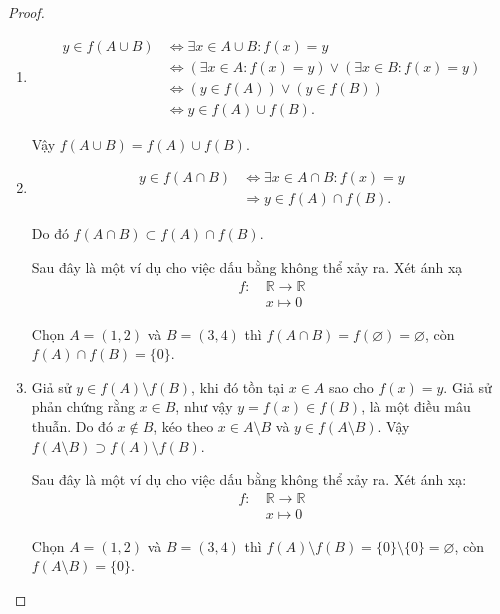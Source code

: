 \begin{proof}
    \begin{enumerate}[label = (\alph*)]
        \item \begin{align*}
                 y\in f(A\cup B) & \Longleftrightarrow \exists x\in A\cup B: f(x) = y \\
                                 & \Longleftrightarrow (\exists x\in A: f(x) = y) \lor (\exists x\in B: f(x) = y) \\
                                 & \Longleftrightarrow (y\in f(A)) \lor (y\in f(B)) \\
                                 & \Longleftrightarrow y\in f(A)\cup f(B).
              \end{align*}

              Vậy $f(A\cup B) = f(A)\cup f(B)$.

        \item \begin{align*}
                  y\in f(A\cap B) & \Longleftrightarrow \exists x\in A\cap B: f(x) = y \\
                                  & \Longrightarrow y\in f(A)\cap f(B).
              \end{align*}

              Do đó $f(A\cap B) \subset f(A)\cap f(B)$.

              \bigskip
              Sau đây là một ví dụ cho việc dấu bằng không thể xảy ra. Xét ánh xạ
              \begin{align*}
                  f:\ & \mathbb{R}\rightarrow \mathbb{R} \\
                      & x\mapsto 0
              \end{align*}
              
              Chọn $A = (1, 2)$ và $B = (3, 4)$ thì $f(A\cap B) = f(\varnothing) = \varnothing$, còn $f(A)\cap f(B) = \{ 0 \}$.

        \item Giả sử $y\in f(A)\setminus f(B)$, khi đó tồn tại $x\in A$ sao cho $f(x) = y$. Giả sử phản chứng rằng $x\in B$, như vậy $y = f(x)\in f(B)$, là một điều mâu thuẫn. Do đó $x\notin B$, kéo theo $x\in A\setminus B$ và $y\in f(A\setminus B)$. Vậy $f(A\setminus B)\supset f(A)\setminus f(B)$.

              \bigskip
              Sau đây là một ví dụ cho việc dấu bằng không thể xảy ra. Xét ánh xạ:
              \begin{align*}
                  f:\ & \mathbb{R}\rightarrow \mathbb{R} \\
                      & x\mapsto 0
              \end{align*}

              Chọn $A = (1, 2)$ và $B = (3, 4)$ thì $f(A)\setminus f(B) = \{0\}\setminus \{0\} = \varnothing$, còn $f(A\setminus B) = \{ 0 \}$.
    \end{enumerate}
\end{proof}

